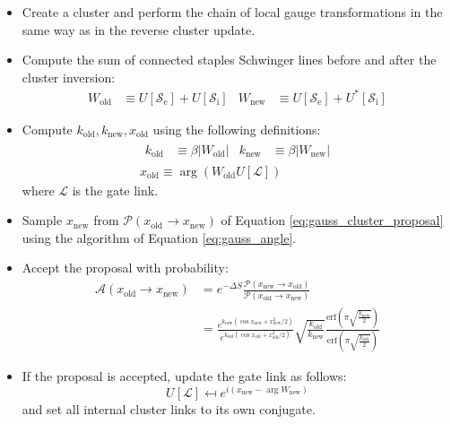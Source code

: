 \begin{itemize}
    \item
        Create a cluster and perform the chain of local gauge transformations in the same way as in the reverse cluster update.
    \item
        Compute the sum of connected staples Schwinger lines before and after the cluster inversion:
        \[\begin{aligned}
            W_\mathrm{old} &\equiv U[\mathcal S_\mathrm{e}] + U[\mathcal S_\mathrm{i}] &
            W_\mathrm{new} &\equiv U[\mathcal S_\mathrm{e}] + U^*[\mathcal S_\mathrm{i}]
        \end{aligned}\]
    \item
        Compute $k_\mathrm{old}, k_\mathrm{new}, x_\mathrm{old}$ using the following definitions:
        \[\begin{gathered}
            \begin{aligned}
                k_\mathrm{old} &\equiv \beta|W_\mathrm{old}| & k_\mathrm{new} &\equiv \beta|W_\mathrm{new}|
            \end{aligned}\\
            x_\mathrm{old} \equiv \arg(W_\mathrm{old}U[\mathcal L])
        \end{gathered}\]
        where $\mathcal L$ is the gate link.
    \item
        Sample $x_\mathrm{new}$ from $\mathcal P(x_\mathrm{old}\to x_\mathrm{new})$ of Equation \eqref{eq:gauss_cluster_proposal}
        using the algorithm of Equation \eqref{eq:gauss_angle}.
    \item
        Accept the proposal with probability:
        \[\begin{aligned}
            \mathcal A(x_\mathrm{old}\to x_\mathrm{new}) &= e^{-\Delta S}\frac{\mathcal P(x_\mathrm{new}\to x_\mathrm{old})}{\mathcal P(x_\mathrm{old}\to x_\mathrm{new})} \\
            &= \frac{e^{k_\mathrm{new}(\cos x_\mathrm{new}+x_\mathrm{new}^2/2)}}{e^{k_\mathrm{old}(\cos x_\mathrm{old}+x_\mathrm{old}^2/2)}}
              \sqrt{\frac{k_\mathrm{old}}{k_\mathrm{new}}}\frac{\mathrm{erf}\left(\pi\sqrt{\frac{k_\mathrm{new}}{2}}\right)}{\mathrm{erf}\left(\pi\sqrt{\frac{k_\mathrm{old}}{2}}\right)}
        \end{aligned}\]
    \item
        If the proposal is accepted, update the gate link as follows:
        \[
            U[\mathcal L] \mapsfrom e^{i(x_\mathrm{new}-\arg W_\mathrm{new})}
        \]
        and set all internal cluster links to its own conjugate.
\end{itemize}


